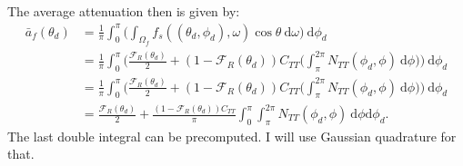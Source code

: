 \documentclass[10pt]{article}
\newcommand{\dee}{\mathrm{d}}
\begin{document}
  The average attenuation then is given by:
  \begin{align*}
  	\bar{a}_f(\theta_d) 
  	&= \frac{1}{\pi} \int_{0}^{\pi}\bigg( \int_{\Omega_f} f_s((\theta_d,\phi_d), \omega)\cos\theta\ \dee \omega  \bigg)\ \dee \phi_d \\
  	&= \frac{1}{\pi} \int_{0}^\pi \bigg( \frac{\mathscr{F}_R(\theta_d)}{2} + 
  	(1-\mathscr{F}_R(\theta_d))C_{TT} \bigg( \int_{\pi}^{2\pi} N_{TT}(\phi_d,\phi)\ \dee\phi \bigg) \bigg)\ \dee \phi_d \\
  	&= \frac{1}{\pi} \int_{0}^\pi \bigg( \frac{\mathscr{F}_R(\theta_d)}{2} + 
  	(1-\mathscr{F}_R(\theta_d))C_{TT} \bigg( \int_{\pi}^{2\pi} N_{TT}(\phi_d,\phi)\ \dee\phi \bigg) \bigg)\ \dee \phi_d \\
  	&= \frac{\mathscr{F}_R(\theta_d)}{2} + \frac{(1-\mathscr{F}_R(\theta_d))C_{TT}}{\pi} \int_{0}^\pi\int_{\pi}^{2\pi} N_{TT}(\phi_d,\phi)\ \dee\phi\dee\phi_d.
  \end{align*}
  The last double integral can be precomputed.  I will use Gaussian quadrature for that.
\end{document}
